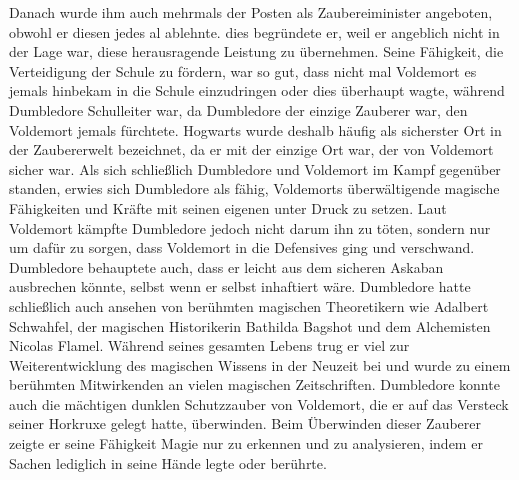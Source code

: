 \documentclass[a4paper, 10pt]{article}
\begin{document}
Danach wurde ihm auch mehrmals der Posten als Zaubereiminister angeboten, obwohl er diesen jedes al ablehnte. dies begründete er, weil er angeblich nicht in der Lage war, diese herausragende Leistung zu übernehmen. Seine Fähigkeit, die Verteidigung der Schule zu fördern, war so gut, dass nicht mal Voldemort es jemals hinbekam in die Schule einzudringen oder dies überhaupt wagte, während Dumbledore Schulleiter war, da Dumbledore der einzige Zauberer war, den Voldemort jemals fürchtete. Hogwarts wurde deshalb häufig als sicherster Ort in der Zaubererwelt bezeichnet, da er mit der einzige Ort war, der von Voldemort sicher war. Als sich schließlich Dumbledore und Voldemort im Kampf gegenüber standen, erwies sich Dumbledore als fähig, Voldemorts überwältigende magische Fähigkeiten und Kräfte mit seinen eigenen unter Druck zu setzen. Laut Voldemort kämpfte Dumbledore jedoch nicht darum ihn zu töten, sondern nur um dafür zu sorgen, dass Voldemort in die Defensives ging und verschwand. Dumbledore behauptete auch, dass er leicht aus dem sicheren Askaban ausbrechen könnte, selbst wenn er selbst inhaftiert wäre. Dumbledore hatte schließlich auch ansehen von berühmten magischen Theoretikern wie Adalbert Schwahfel, der magischen Historikerin Bathilda Bagshot und dem Alchemisten Nicolas Flamel. Während seines gesamten Lebens trug er viel zur Weiterentwicklung des magischen Wissens in der Neuzeit bei und wurde zu einem berühmten Mitwirkenden an vielen magischen Zeitschriften. Dumbledore konnte auch die mächtigen dunklen Schutzzauber von Voldemort, die er auf das Versteck seiner Horkruxe gelegt hatte, überwinden. Beim Überwinden dieser Zauberer zeigte er seine Fähigkeit Magie nur zu erkennen und zu analysieren, indem er Sachen lediglich in seine Hände legte oder berührte.
\end{document}
